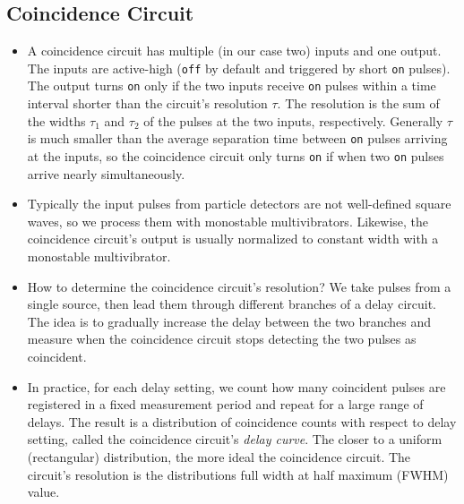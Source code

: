 \documentclass[11pt, a4paper]{article}
\begin{document}
\subsection{Coincidence Circuit}
\begin{itemize}
	\item A coincidence circuit has multiple (in our case two) inputs and one output. The inputs are active-high (\texttt{off} by default and triggered by short \texttt{on} pulses). The output turns \texttt{on} only if the two inputs receive \texttt{on} pulses within a time interval shorter than the circuit's resolution $ \tau $. The resolution is the sum of the widths $ \tau_{1} $ and $ \tau_{2} $ of the pulses at the two inputs, respectively. Generally $ \tau $ is much smaller than the average separation time between \texttt{on} pulses arriving at the inputs, so the coincidence circuit only turns \texttt{on} if when two \texttt{on} pulses arrive nearly simultaneously.
	
	\item Typically the input pulses from particle detectors are not well-defined square waves, so we process them with monostable multivibrators. Likewise, the coincidence circuit's output is usually normalized to constant width with a monostable multivibrator. 
	
	\item How to determine the coincidence circuit's resolution? We take pulses from a single source, then lead them through different branches of a delay circuit. The idea is to gradually increase the delay between the two branches and measure when the coincidence circuit stops detecting the two pulses as coincident. 
	
	\item In practice, for each delay setting, we count how many coincident pulses are registered in a fixed measurement period and repeat for a large range of delays. The result is a distribution of coincidence counts with respect to delay setting, called the coincidence circuit's \textit{delay curve}.  The closer to a uniform (rectangular) distribution, the more ideal the coincidence circuit. The circuit's resolution is the distributions full width at half maximum (FWHM) value.
	
\end{itemize}
\end{document}
